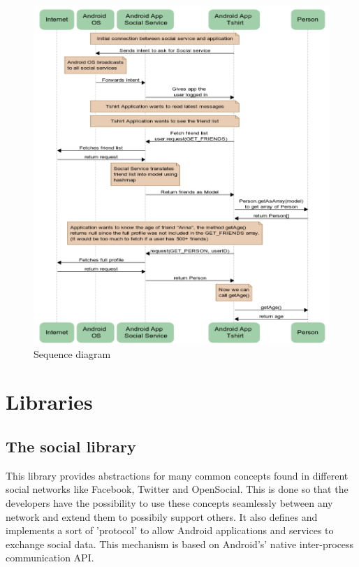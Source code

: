 \begin{figure}[h!]
	\centering \includegraphics[width=1.0\textwidth]{img/design-sequence.png}
	\caption{Sequence diagram}
	\label{fig:design-sequence}
\end{figure}


\section{Libraries}

\subsection{The social library}
This library provides abstractions for many common concepts found in different
social networks like Facebook, Twitter and OpenSocial. This is done so that the developers
have the possibility to use these concepts seamlessly between any network and extend them to
possibily support others. It also defines and implements a sort of 'protocol' to allow Android
applications and services to exchange social data. This mechanism is based on Android's' native
inter-process communication API.

